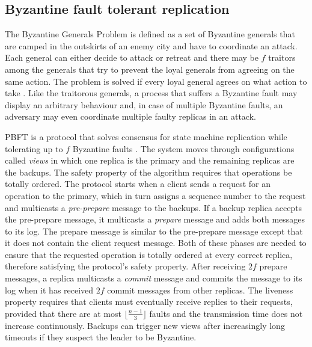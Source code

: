 \subsection{Byzantine fault tolerant replication} \label{Non-Crash}
The Byzantine Generals Problem is defined as a set of Byzantine generals that are camped in the outskirts of an enemy city and have to coordinate an attack. Each general can either decide to attack or retreat and there may be $f$ traitors among the generals that try to prevent the loyal generals from agreeing on the same action. The problem is solved if every loyal general agrees on what action to take \cite{LSP82}. Like the traitorous generals, a process that suffers a Byzantine fault may display an arbitrary behaviour and, in case of multiple Byzantine faults, an adversary may even coordinate multiple faulty replicas in an attack. \par
PBFT is a protocol that solves consensus for state machine replication while tolerating up to $f$ Byzantine faults \cite{CL99}. The system moves through configurations called \textit{views} in which one replica is the primary and the remaining replicas are the backups. The safety property of the algorithm requires that operations be totally ordered. The protocol starts when a client sends a request for an operation to the primary, which in turn assigns a sequence number to the request and multicasts a \textit{pre-prepare} message to the backups. If a backup replica accepts the pre-prepare message, it multicasts a \textit{prepare} message and adds both messages to its log. The prepare message is similar to the pre-prepare message except that it does not contain the client request message. Both of these phases are needed to ensure that the requested operation is totally ordered at every correct replica, therefore satisfying the protocol's safety property. After receiving $2f$ prepare messages, a replica multicasts a \textit{commit} message and commits the message to its log when it has received $2f$ commit messages from other replicas. The liveness property requires that clients must eventually receive replies to their requests, provided that there are at most $\lfloor\frac{n-1}{3}\rfloor$ faults and the transmission time does not increase continuously. Backups can trigger new views after increasingly long timeouts if they suspect the leader to be Byzantine. \par

